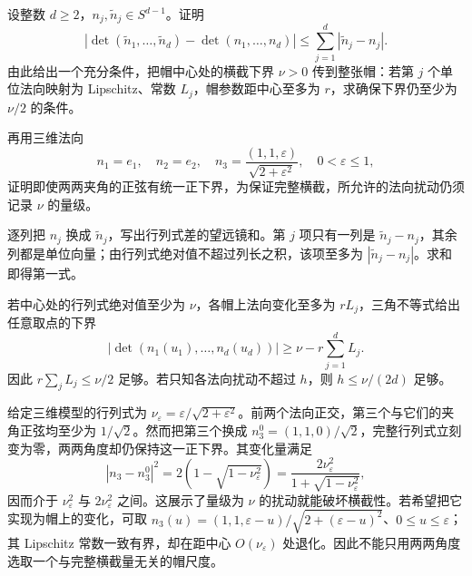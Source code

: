 \begin{optionalexercise}\label{b2:ex:25-new-3}
设整数 \(d\geq2\)，\(n_j,\widetilde n_j\in S^{d-1}\)。证明
\[
 \left|\det(\widetilde n_1,\ldots,\widetilde n_d)
             -\det(n_1,\ldots,n_d)\right|
       \leq\sum_{j=1}^d|\widetilde n_j-n_j|.
\]
由此给出一个充分条件，把帽中心处的横截下界 \(\nu>0\) 传到整张帽：若第 \(j\) 个单位法向映射为 Lipschitz、常数 \(L_j\)，帽参数距中心至多为 \(r\)，求确保下界仍至少为 \(\nu/2\) 的条件。

\ProseParagraphBreak

再用三维法向
\[
 n_1=e_1,\quad n_2=e_2,\quad
 n_3=\frac{(1,1,\varepsilon)}{\sqrt{2+\varepsilon^2}},
 \quad0<\varepsilon\leq1,
\]
证明即使两两夹角的正弦有统一正下界，为保证完整横截，所允许的法向扰动仍须记录 \(\nu\) 的量级。
\end{optionalexercise}
\begin{solution}
逐列把 \(n_j\) 换成 \(\widetilde n_j\)，写出行列式差的望远镜和。第 \(j\) 项只有一列是 \(\widetilde n_j-n_j\)，其余列都是单位向量；由行列式绝对值不超过列长之积，该项至多为 \(|\widetilde n_j-n_j|\)。求和即得第一式。

若中心处的行列式绝对值至少为 \(\nu\)，各帽上法向变化至多为 \(rL_j\)，三角不等式给出任意取点的下界
\[
 |\det(n_1(u_1),\ldots,n_d(u_d))|
       \geq\nu-r\sum_{j=1}^dL_j.
\]
因此 \(r\sum_jL_j\leq\nu/2\) 足够。若只知各法向扰动不超过 \(h\)，则 \(h\leq\nu/(2d)\) 足够。

给定三维模型的行列式为
\(\nu_\varepsilon=\varepsilon/\sqrt{2+\varepsilon^2}\)。前两个法向正交，第三个与它们的夹角正弦均至少为 \(1/\sqrt2\)。然而把第三个换成
\(n_3^0=(1,1,0)/\sqrt2\)，完整行列式立刻变为零，两两角度却仍保持这一正下界。其变化量满足
\[
 |n_3-n_3^0|^2
 =2\left(1-\sqrt{1-\nu_\varepsilon^2}\right)
 =\frac{2\nu_\varepsilon^2}{1+\sqrt{1-\nu_\varepsilon^2}},
\]
因而介于 \(\nu_\varepsilon^2\) 与 \(2\nu_\varepsilon^2\) 之间。这展示了量级为 \(\nu\) 的扰动就能破坏横截性。若希望把它实现为帽上的变化，可取
\(n_3(u)=(1,1,\varepsilon-u)/\sqrt{2+(\varepsilon-u)^2}\)、\(0\leq u\leq\varepsilon\)；其 Lipschitz 常数一致有界，却在距中心 \(O(\nu_\varepsilon)\) 处退化。因此不能只用两两角度选取一个与完整横截量无关的帽尺度。
\end{solution}

